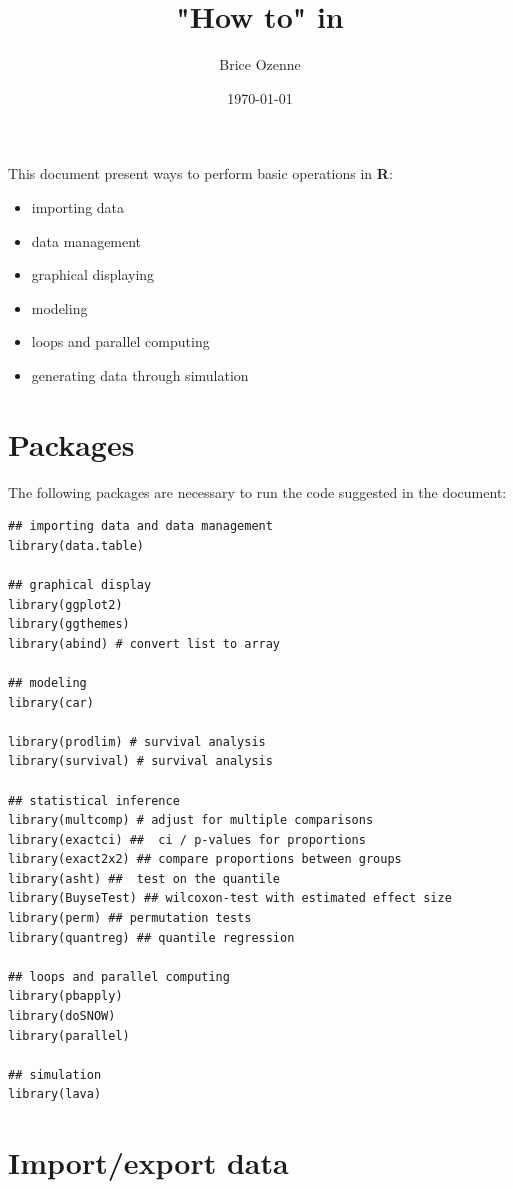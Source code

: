 \documentclass{article}
\author{Brice Ozenne}
\date{\today}
\title{"How to" in \Rlogo}
\newcommand\Rlogo{\textbf{\textsf{R}}\xspace}
\begin{document}
\maketitle
This document present ways to perform basic operations in \Rlogo:
\begin{itemize}
\item importing data
\item data management
\item graphical displaying
\item modeling
\item loops and parallel computing
\item generating data through simulation
\end{itemize}

\clearpage

\tableofcontents

\clearpage

\section{Packages}
\label{sec:org753085e}
The following packages are necessary to run the code suggested in the document:
\lstset{language=r,label= ,caption= ,captionpos=b,numbers=none}
\begin{lstlisting}
## importing data and data management
library(data.table)

## graphical display
library(ggplot2)
library(ggthemes)
library(abind) # convert list to array

## modeling
library(car)

library(prodlim) # survival analysis
library(survival) # survival analysis

## statistical inference
library(multcomp) # adjust for multiple comparisons
library(exactci) ##  ci / p-values for proportions 
library(exact2x2) ## compare proportions between groups
library(asht) ##  test on the quantile
library(BuyseTest) ## wilcoxon-test with estimated effect size
library(perm) ## permutation tests
library(quantreg) ## quantile regression

## loops and parallel computing
library(pbapply)
library(doSNOW)
library(parallel)

## simulation
library(lava)
\end{lstlisting}

\clearpage

\section{Import/export data}
\label{sec:orge8ae43c}
\end{document}
